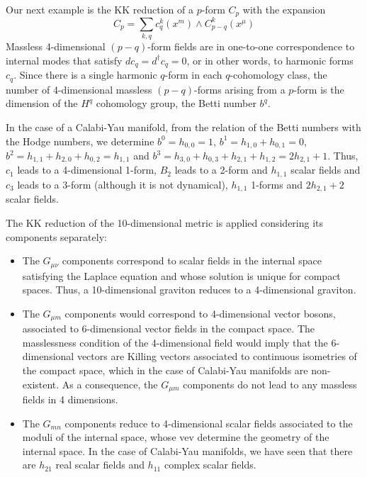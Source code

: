 Our next example is the KK reduction of a $p$-form $C_p$ with the expansion 
\begin{equation}
  C_p=\sum_{k,q} c_q^k(x^m)\wedge C^k_{p-q}(x^\mu)
\end{equation}
Massless 4-dimensional $(p-q)$-form fields are in one-to-one correspondence to internal modes that satisfy $dc_q=d^\dagger c_q=0$, 
or in other words, to harmonic forms $c_q$.
Since there is a single harmonic $q$-form in each $q$-cohomology class, 
the number of 4-dimensional massless $(p-q)$-forms arising from a $p$-form is the dimension of the $H^q$ cohomology group, the 
Betti number $b^q$.

In the case of a Calabi-Yau manifold, from the relation of the Betti numbers with the Hodge numbers,
we determine $b^0=h_{0,0}=1$, $b^1=h_{1,0}+h_{0,1}=0$, $b^2=h_{1,1}+h_{2,0}+h_{0,2}=h_{1,1}$ and
$b^3=h_{3,0}+h_{0,3}+h_{2,1}+h_{1,2}=2h_{2,1}+1$.
Thus, $c_1$ leads to a 4-dimensional 1-form, 
$B_2$ leads to a 2-form and  $h_{1,1}$ scalar fields 
and $c_3$ leads to a 3-form (although it is not dynamical), $h_{1,1}$ 1-forms and $2h_{2,1}+2$ scalar fields.

The KK reduction of the 10-dimensional metric is applied considering its components separately:
\begin{itemize}
  \item The $G_{\mu\nu}$ components correspond to scalar fields in the internal space satisfying 
    the Laplace equation and whose solution is unique for compact spaces.
    Thus, a 10-dimensional graviton reduces to a 4-dimensional graviton.
  \item The $G_{\mu m}$ components would correspond to 4-dimensional vector bosons, associated
    to 6-dimensional vector fields in the compact space. 
    The masslessness condition of the 4-dimensional field would imply that the 6-dimensional 
    vectors are Killing vectors associated to continuous isometries of the compact space, which
    in the case of Calabi-Yau manifolds are non-existent.
    As a consequence, the $G_{\mu m}$ components do not lead to any massless fields in 4 dimensions.
  \item The $G_{m n}$ components reduce to 4-dimensional scalar fields associated to the moduli of the internal space,
    whose vev determine the geometry of the internal space.
    In the case of Calabi-Yau manifolds, we have seen that there are $h_{21}$ real scalar fields and
    $h_{11}$ complex scalar fields.

%
%
\end{itemize}

